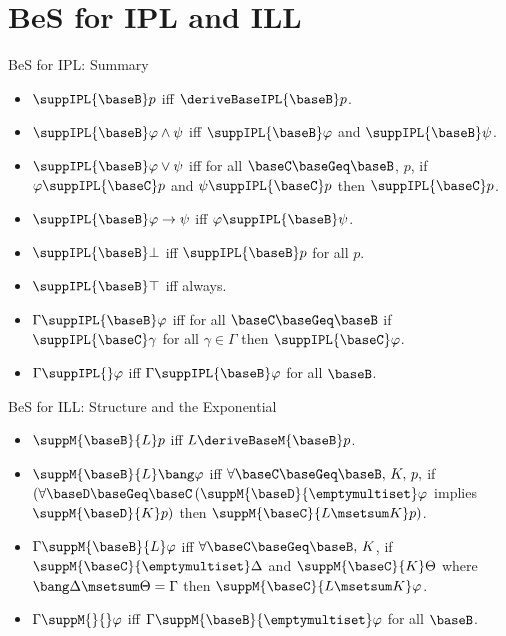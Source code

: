 \documentclass{beamer}
\begin{document}
\section{BeS for IPL and ILL}
\begin{frame}{BeS for IPL: Summary}
	\begin{itemize}
		\item $\suppIPL{\baseB}p$ iff $\deriveBaseIPL{\baseB}p$.\vspace{0.3cm}
		\item $\suppIPL{\baseB}\varphi\land\psi$ iff $\suppIPL{\baseB}\varphi$ and $\suppIPL{\baseB}\psi$.\vspace{0.3cm}
		\item $\suppIPL{\baseB}\varphi\lor\psi$ iff for all $\baseC\baseGeq\baseB$, $p$, if $\varphi\suppIPL{\baseC}p$ and $\psi\suppIPL{\baseC}p$ then $\suppIPL{\baseC}p$.\vspace{0.3cm}
		\item $\suppIPL{\baseB}\varphi\to\psi$ iff $\varphi\suppIPL{\baseB}\psi$.\vspace{0.3cm}
		\item $\suppIPL{\baseB}\bot$ iff $\suppIPL{\baseB}p$ for all $p$.\vspace{0.3cm}
		\item $\suppIPL{\baseB}\top$ iff always.\vspace{0.3cm}
		\item $\Gamma\suppIPL{\baseB}\varphi$ iff for all $\baseC\baseGeq\baseB$ if $\suppIPL{\baseC}\gamma$ for all $\gamma\in\Gamma$ then $\suppIPL{\baseC}\varphi$.\vspace{0.3cm}
		\item $\Gamma\suppIPL{}\varphi$ iff $\Gamma\suppIPL{\baseB}\varphi$ for all $\baseB$.
	\end{itemize}
\end{frame}
\begin{frame}{BeS for ILL: Structure and the Exponential}
	\begin{itemize}
	\item $\suppM{\baseB}{L}p$ iff $L\deriveBaseM{\baseB}p$.\vspace{0.3cm}
	\item $\suppM{\baseB}{L}\bang\varphi$ iff \newline $\forall\baseC\baseGeq\baseB,\, K,\,p,$ if $(\forall\baseD\baseGeq\baseC\, (\suppM{\baseD}{\emptymultiset}\varphi$ implies $\suppM{\baseD}{K}p)$ then $\suppM{\baseC}{L\msetsum K}p)$.\vspace{0.3cm}
	\item $\Gamma\suppM{\baseB}{L}\varphi$ iff \newline $\forall\baseC\baseGeq\baseB,\, K$, if $\suppM{\baseC}{\emptymultiset}\Delta$ and $\suppM{\baseC}{K}\Theta$ where $\bang\Delta\msetsum\Theta = \Gamma$ then $\suppM{\baseC}{L\msetsum K}\varphi$.\vspace{0.3cm}
	\item $\Gamma\suppM{}{}\varphi$ iff $\Gamma\suppM{\baseB}{\emptymultiset}\varphi$ for all $\baseB$.
	\end{itemize}
\end{frame}
\end{document}
